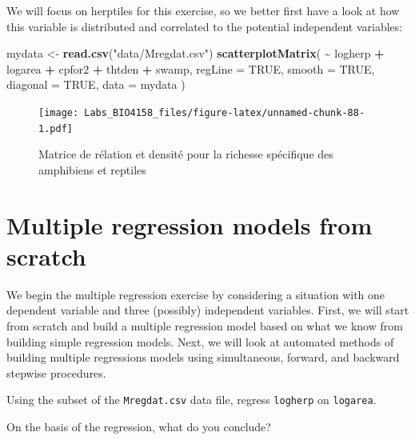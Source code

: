 \documentclass[
  12pt,
]{book}
\makeatletter
\newenvironment{Shaded}{\begin{snugshade}}{\end{snugshade}}
\newcommand{\DataTypeTok}[1]{\textcolor[rgb]{0.13,0.29,0.53}{#1}}
\newcommand{\KeywordTok}[1]{\textcolor[rgb]{0.13,0.29,0.53}{\textbf{#1}}}
\newcommand{\NormalTok}[1]{#1}
\newcommand{\OperatorTok}[1]{\textcolor[rgb]{0.81,0.36,0.00}{\textbf{#1}}}
\newcommand{\OtherTok}[1]{\textcolor[rgb]{0.56,0.35,0.01}{#1}}
\newcommand{\StringTok}[1]{\textcolor[rgb]{0.31,0.60,0.02}{#1}}
\newenvironment{kframe}{%
\medskip{}
\setlength{\fboxsep}{.8em}
\def\at@end@of@kframe{}%
\ifinner\ifhmode%
 \def\at@end@of@kframe{\end{minipage}}%
 \begin{minipage}{\columnwidth}%
\fi\fi%
\def\FrameCommand##1{\hskip\@totalleftmargin \hskip-\fboxsep
\colorbox{incolor}{##1}\hskip-\fboxsep
    \hskip-\linewidth \hskip-\@totalleftmargin \hskip\columnwidth}%
\MakeFramed {\advance\hsize-\width
  \@totalleftmargin\z@ \linewidth\hsize
  \@setminipage}}%
{\par\unskip\endMakeFramed%
\at@end@of@kframe}
\newenvironment{rmdblock}[1]
 {
 \begin{itemize}
 \renewcommand{\labelitemi}{
   \raisebox{-.7\height}[0pt][0pt]{
     {\setkeys{Gin}{width=3em,keepaspectratio}\texttt{[image: images/\#1]}}
   }
 }
 \begin{kframe}
 \setlength{\fboxsep}{1em}
 \item
 }
 {
 \end{kframe}
 \end{itemize}
 }
\newenvironment{rmdcode}
  {\begin{rmdblock}{screen}}
  {\end{rmdblock}}
\makeatother
\begin{document}
We will focus on herptiles for this exercise, so we better first have a look at how this variable is distributed and correlated to the potential independent variables:

\begin{Shaded}
\begin{Highlighting}[]
\NormalTok{mydata \textless{}{-}}\StringTok{ }\KeywordTok{read.csv}\NormalTok{(}\StringTok{"data/Mregdat.csv"}\NormalTok{)}
\KeywordTok{scatterplotMatrix}\NormalTok{(}
  \OperatorTok{\textasciitilde{}}\StringTok{ }\NormalTok{logherp }\OperatorTok{+}\StringTok{ }\NormalTok{logarea }\OperatorTok{+}\StringTok{ }\NormalTok{cpfor2 }\OperatorTok{+}\StringTok{ }\NormalTok{thtden }\OperatorTok{+}\StringTok{ }\NormalTok{swamp,}
  \DataTypeTok{regLine =} \OtherTok{TRUE}\NormalTok{, }\DataTypeTok{smooth =} \OtherTok{TRUE}\NormalTok{, }\DataTypeTok{diagonal =} \OtherTok{TRUE}\NormalTok{,}
  \DataTypeTok{data =}\NormalTok{ mydata}
\NormalTok{)}
\end{Highlighting}
\end{Shaded}

\begin{figure}
\centering
\texttt{[image: Labs\_BIO4158\_files/figure-latex/unnamed-chunk-88-1.pdf]}
\caption{\label{fig:unnamed-chunk-88}Matrice de rélation et densité pour la richesse spécifique des amphibiens et reptiles}
\end{figure}

\hypertarget{multiple-regression-models-from-scratch}{%
\section{Multiple regression models from scratch}\label{multiple-regression-models-from-scratch}}

We begin the multiple regression exercise by considering a situation with one dependent variable and three (possibly) independent variables. First, we will start from scratch and build a multiple regression model based on what we know from building simple regression models. Next, we will look at automated methods of building multiple regressions models using simultaneous, forward, and backward stepwise procedures.

\begin{rmdcode}
Using the subset of the \texttt{Mregdat.csv} data file, regress \texttt{logherp} on \texttt{logarea}.
\end{rmdcode}

On the basis of the regression, what do you conclude?
\end{document}
